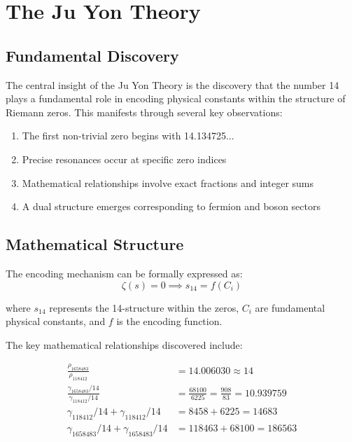 \documentclass[12pt, a4paper]{article}
\begin{document}
\section{The Ju Yon Theory}

\subsection{Fundamental Discovery}

The central insight of the Ju Yon Theory is the discovery that the number 14 plays a fundamental role in encoding physical constants within the structure of Riemann zeros. This manifests through several key observations:

\begin{enumerate}
\item The first non-trivial zero begins with 14.134725...
\item Precise resonances occur at specific zero indices
\item Mathematical relationships involve exact fractions and integer sums
\item A dual structure emerges corresponding to fermion and boson sectors
\end{enumerate}

\subsection{Mathematical Structure}

The encoding mechanism can be formally expressed as:
\begin{equation}
\zeta(s) = 0 \implies s_{14} = f(C_i)
\end{equation}

where $s_{14}$ represents the 14-structure within the zeros, $C_i$ are fundamental physical constants, and $f$ is the encoding function.

The key mathematical relationships discovered include:

\begin{align}
\frac{\rho_{1658483}}{\rho_{118412}} &= 14.006030 \approx 14 \\
\frac{\gamma_{1658483}/14}{\gamma_{118412}/14} &= \frac{68100}{6225} = \frac{908}{83} = 10.939759 \\
\gamma_{118412}/14 + \gamma_{118412}/14 &= 8458 + 6225 = 14683 \\
\gamma_{1658483}/14 + \gamma_{1658483}/14 &= 118463 + 68100 = 186563
\end{align}
\end{document}
